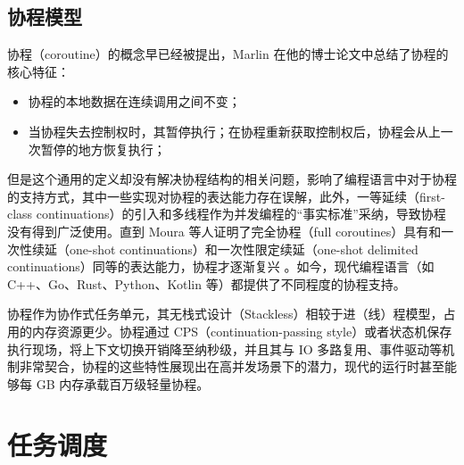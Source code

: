 \subsection{协程模型}

协程（coroutine）的概念早已经被提出，Marlin 在他的博士论文中总结了协程的核心特征\cite{marlin1980coroutines}：
\begin{itemize}
    \item 协程的本地数据在连续调用之间不变；
    \item 当协程失去控制权时，其暂停执行；在协程重新获取控制权后，协程会从上一次暂停的地方恢复执行；
\end{itemize}
但是这个通用的定义却没有解决协程结构的相关问题，影响了编程语言中对于协程的支持方式，其中一些实现对协程的表达能力存在误解，此外，一等延续（first-class continuations）的引入和多线程作为并发编程的“事实标准”采纳，导致协程没有得到广泛使用。直到 Moura 等人证明了完全协程（full coroutines）具有和一次性续延（one-shot continuations）和一次性限定续延（one-shot delimited continuations）同等的表达能力，协程才逐渐复兴 \cite{moura2009revisiting}。如今，现代编程语言（如 C++、Go、Rust、Python、Kotlin 等）都提供了不同程度的协程支持。

协程作为协作式任务单元，其无栈式设计（Stackless）相较于进（线）程模型，占用的内存资源更少。协程通过 CPS（continuation-passing style）或者状态机保存执行现场，将上下文切换开销降至纳秒级，并且其与 IO 多路复用、事件驱动等机制非常契合，协程的这些特性展现出在高并发场景下的潜力，现代的运行时甚至能够每 GB 内存承载百万级轻量协程。

\section{任务调度}

